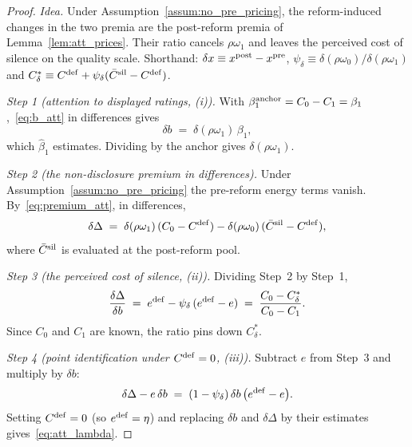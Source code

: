 \begin{proof}\upshape
\emph{Idea.} Under Assumption~\ref{assum:no_pre_pricing}, the reform-induced changes in the two premia are the post-reform premia of Lemma~\ref{lem:att_prices}. Their ratio cancels $\rho\omega_1$ and leaves the perceived cost of silence on the quality scale. Shorthand: $\delta x\equiv x^{\rm post}-x^{\rm pre}$, $\psi_\delta\equiv\delta(\rho\omega_0)/\delta(\rho\omega_1)$ and $C^*_\delta\equiv C^{\rm def}+\psi_\delta(\bar C^{\rm sil}-C^{\rm def})$.

\emph{Step 1 (attention to displayed ratings, (i)).} With $\beta_1^{\rm anchor}=C_0-C_1=\beta_1$,~\eqref{eq:b_att} in differences gives
\begin{equation*}
    \delta b\;=\;\delta(\rho\omega_1)\,\beta_1,
\end{equation*}
which $\hat\beta_1$ estimates. Dividing by the anchor gives $\delta(\rho\omega_1)$.

\emph{Step 2 (the non-disclosure premium in differences).} Under Assumption~\ref{assum:no_pre_pricing} the pre-reform energy terms vanish. By~\eqref{eq:premium_att}, in differences,
\begin{equation*}
    \delta\Delta\;=\;\delta(\rho\omega_1)\,(C_0-C^{\rm def})-\delta(\rho\omega_0)\,(\bar C^{\rm sil}-C^{\rm def}),
\end{equation*}
where $\bar C^{\rm sil}$ is evaluated at the post-reform pool.

\emph{Step 3 (the perceived cost of silence, (ii)).} Dividing Step~2 by Step~1,
\begin{equation*}
    \frac{\delta\Delta}{\delta b}\;=\;e^{\rm def}-\psi_\delta\,(e^{\rm def}-e)\;=\;\frac{C_0-C^*_\delta}{C_0-C_1}.
\end{equation*}
Since $C_0$ and $C_1$ are known, the ratio pins down $C^*_\delta$.

\emph{Step 4 (point identification under $C^{\rm def}=0$, (iii)).} Subtract $e$ from Step~3 and multiply by $\delta b$:
\begin{equation*}
    \delta\Delta-e\,\delta b\;=\;(1-\psi_\delta)\,\delta b\,\big(e^{\rm def}-e\big).
\end{equation*}
Setting $C^{\rm def}=0$ (so $e^{\rm def}=\eta$) and replacing $\delta b$ and $\delta\Delta$ by their estimates gives~\eqref{eq:att_lambda}.


\end{proof}
